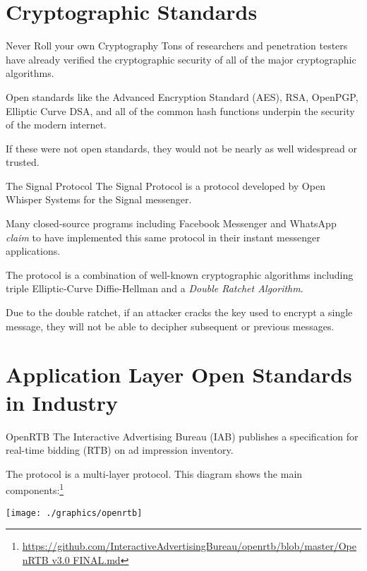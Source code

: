 \documentclass{acm}
\begin{document}
\section{Cryptographic Standards}

\begin{frame}{Never Roll your own Cryptography}
    Tons of researchers and penetration testers have already verified the
    cryptographic security of all of the major cryptographic algorithms.
    \pause

    Open standards like the Advanced Encryption Standard (AES), RSA, OpenPGP,
    Elliptic Curve DSA, and all of the common hash functions underpin the
    security of the modern internet.
    \pause

    If these were not open standards, they would not be nearly as well
    widespread or trusted.
\end{frame}

\begin{frame}{The Signal Protocol}
    The Signal Protocol is a protocol developed by Open Whisper Systems for the
    Signal messenger.
    \pause

    Many closed-source programs including Facebook Messenger and WhatsApp
    \textit{claim} to have implemented this same protocol in their instant
    messenger applications.
    \pause

    The protocol is a combination of well-known cryptographic algorithms
    including triple Elliptic-Curve Diffie-Hellman and a \textit{Double Ratchet
        Algorithm}.
    \pause

    Due to the double ratchet, if an attacker cracks the key used to encrypt a
    single message, they will not be able to decipher subsequent or previous
    messages.
\end{frame}

\section{Application Layer Open Standards in Industry}

\begin{frame}{OpenRTB}
    The Interactive Advertising Bureau (IAB) publishes a specification for
    real-time bidding (RTB) on ad impression inventory.

    The protocol is a multi-layer protocol. This diagram shows the main
    components:\footnote[frame]{
        \url{https://github.com/InteractiveAdvertisingBureau/openrtb/blob/master/OpenRTB v3.0 FINAL.md}}

    \texttt{[image: ./graphics/openrtb]}
\end{frame}
\end{document}
